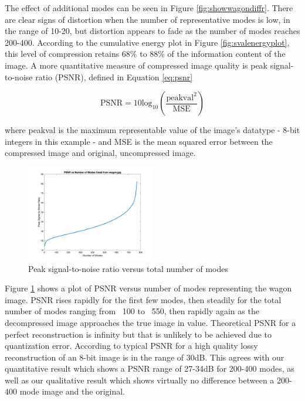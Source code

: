 \documentclass[conference]{IEEEtran}
\begin{document}
    The effect of additional modes can be seen in Figure \ref{fig:showwagondiffr}. There are clear signs of distortion when the number of representative modes is low, in the range of 10-20, but distortion appears to fade as the number of modes reaches 200-400. According to the cumulative energy plot in Figure \ref{fig:svalenergyplot}, this level of compression retains 68\% to 88\% of the information content of the image. A more quantitative measure of compressed image quality is peak signal-to-noise ratio (PSNR), defined in Equation \ref{eq:psnr}

    \begin{equation}
    		\text{PSNR} = 10\text{log}_{10}\left(\frac{\text{peakval}^2}{\text{MSE}}\right)
    \label{eq:psnr}
    \end{equation}

    where peakval is the maximum representable value of the image's datatype - 8-bit integers in this example - and MSE is the mean squared error between the compressed image and original, uncompressed image.

	\begin{figure}[t]
        \includegraphics[width=0.5\textwidth]{snrvsr_wagon_rgb}
        \caption{Peak signal-to-noise ratio versus total number of modes}
        \label{fig:psnrvsr_wagon}
    \end{figure}
    
    Figure \ref{fig:psnrvsr_wagon} shows a plot of PSNR versus number of modes representing the wagon image. PSNR rises rapidly for the first few modes, then steadily for the total number of modes ranging from ~100 to ~550, then rapidly again as the decompressed image approaches the true image in value. Theoretical PSNR for a perfect reconstruction is infinity but that is unlikely to be achieved due to quantization error. According to \cite{psnr_quality} typical PSNR for a high quality lossy reconstruction of an 8-bit image is in the range of 30dB. This agrees with our quantitative result which shows a PSNR range of 27-34dB for 200-400 modes, as well as our qualitative result which shows virtually no difference between a 200-400 mode image and the original.
\end{document}
